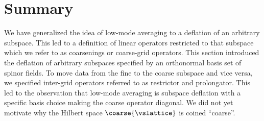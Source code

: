 \section{Summary}
\label{sec:sd:summary}

We have generalized the idea of low-mode averaging to a deflation of an arbitrary subspace.
This led to a definition of linear operators restricted to that subspace which we refer to as coarsenings or coarse-grid operators.
This section introduced the deflation of arbitrary subspaces specified by an orthonormal basis set of spinor fields.
To move data from the fine to the coarse subspace and vice versa, we specified inter-grid operators referred to as restrictor and prolongator.
This led to the observation that low-mode averaging is subspace deflation with a specific basis choice making the coarse operator diagonal.
We did not yet motivate why the Hilbert space $\coarse{\vslattice}$ is coined ``coarse''.
